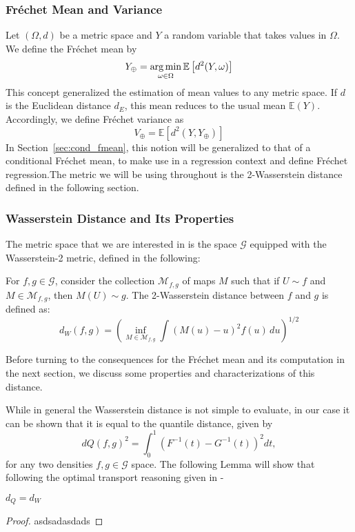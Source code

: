 \subsubsection{Fréchet Mean and Variance}
\label{sec:f_mean}
Let $(\Omega, d)$ be a metric space and $Y$ a random variable that takes values in
$\Omega$. We define the Fréchet mean by
\begin{equation}
    Y_\oplus = \operatorname*{arg\,min}_{\omega \in \Omega} \mathbb{E} \left[ d^2(Y, \omega) \right]
    \label{eq:fmean}
\end{equation}
This concept generalized the estimation of mean values to any metric space. If $d$ is
the Euclidean distance $d_E$, this mean reduces to the usual mean $\mathbb{E}(Y)$. Accordingly,
we define Fréchet variance as
\begin{equation}
    V_\oplus = \mathbb{E} \left[ d^2(Y, Y_\oplus) \right]
    \label{eq:fvar}
\end{equation}
In Section~\ref{sec:cond_fmean}, this notion will be generalized to that of a conditional
Fréchet mean, to make use in a regression context and define Fréchet regression.The metric
we will be using throughout is the 2-Wasserstein distance defined in the following section.

\subsubsection{Wasserstein Distance and Its Properties}
\label{sec:wasserstein_distance}
The metric space that we are interested in is the space $\mathcal{G}$ equipped with the
Wasserstein-2 metric, defined in the following:
\begin{definition}
    \label{def:wasserstein_2_dist}
    For \( f, g \in \mathcal{G} \), consider the collection \( \mathcal{M}_{f,g} \) of maps \( M \)
    such that if \( U \sim f \) and \( M \in \mathcal{M}_{f,g} \), then \( M(U) \sim g \).
    The 2-Wasserstein distance between \( f \) and \( g \) is defined as:
    \[
    d_W(f, g) = \left( \inf_{M \in \mathcal{M}_{f,g}} \int (M(u) - u)^2 f(u) \, du \right)^{1/2}
    \]
\end{definition}
Before turning to the consequences for the Fréchet mean and its computation in the next section,
we discuss some properties and characterizations of this distance.

While in general the Wasserstein distance is not simple to evaluate, in our case it can
be shown that it is equal to the quantile distance, given by
\[
dQ(f, g)^2 = \int_{0}^{1} (F^{-1}(t) - G^{-1}(t))^2 dt,
\]
for any two densities $f, g \in \mathcal{G}$ space. The following Lemma will show that
following the optimal transport reasoning given in \textcite{PetersenLiuDivani2021}-
\begin{lemma}
    \label{lemma:dqeqdw}
    $d_Q = d_W$
\end{lemma}
\begin{proof}
    asdsadasdads
\end{proof}


